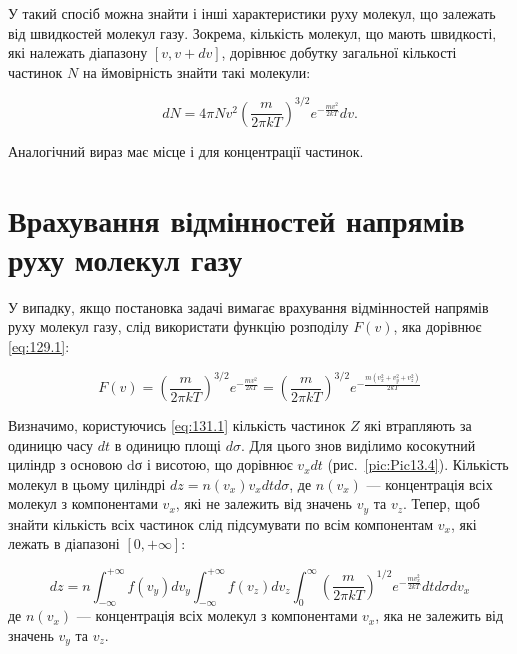 У такий спосіб можна знайти і інші характеристики руху молекул, що залежать від швидкостей молекул газу. Зокрема, кількість молекул, що мають швидкості, які належать діапазону $[v, v + dv]$, дорівнює добутку загальної кількості частинок $N$ на ймовірність знайти такі молекули:

\begin{equation}
dN = 4\pi N v^2\left(\frac{m}{2\pi kT}\right)^{3/2}e^{-\frac{mv^2}{2kT}}dv.
\label{eq:130.6}
\end{equation}

Аналогічний вираз має місце і для концентрації частинок.




\section{Врахування відмінностей напрямів руху молекул газу}

У випадку, якщо постановка задачі вимагає врахування відмінностей напрямів руху молекул газу, слід використати функцію розподілу $F(v)$, яка дорівнює \eqref{eq:129.1}:

\begin{equation}
F(v) = \left(\frac{m}{2\pi kT}\right)^{3/2} e^{-\frac{mv^2}{2kT}} = \left(\frac{m}{2\pi kT}\right)^{3/2} e^{-\frac{m(v_x^2 + v_y^2 + v_z^2)}{2kT}}
\label{eq:131.1}
\end{equation}

Визначимо, користуючись \eqref{eq:131.1} кількість частинок $Z$ які втрапляють за одиницю часу $dt$ в одиницю площі $d\sigma$. Для цього знов виділимо косокутний циліндр з основою dσ і висотою, що дорівнює $v_xdt$ (рис.~\ref{pic:Pic13.4}). Кількість молекул в цьому циліндрі $dz=n(v_x)v_xdtd\sigma$, де $n(v_x)$ --- концентрація всіх молекул з компонентами $v_x$, які не залежить від значень $v_y$ та $v_z$. Тепер, щоб знайти кількість всіх частинок слід підсумувати по всім компонентам $v_x$, які лежать в діапазоні $[0,+\infty]$:

\begin{equation}\label{eq:131.2}
dz=n\int_{-\infty}^{+\infty}{f\left(v_y\right)dv_y}\int_{-\infty}^{+\infty}{f\left(v_z\right)dv_z}\int_{0}^{\infty}{\left(\frac{m}{2\pi kT}\right)^{1/2}e^{-\frac{mv_x^2}{2kT}}dtd\sigma dv_x}
\end{equation}
%
де $n(v_x)$ --- концентрація всіх молекул з компонентами $v_x$, яка не залежить від значень $v_y$ та $v_z$.

